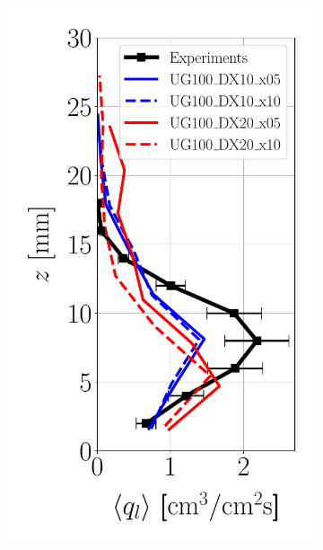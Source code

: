 \begin{figure}[h!]
\flushleft
\begin{subfigure}[b]{0.2\textwidth}
	\flushleft
   \includegraphics[scale=0.35]{./part2_developments/figures_ch6_lagrangian_JICF/params_resol_and_xInj/profiles/flux_along_z}
\end{subfigure}
\hspace*{0.5in}
\begin{subfigure}[b]{0.2\textwidth}
	\flushleft

\end{subfigure}
\end{figure}
